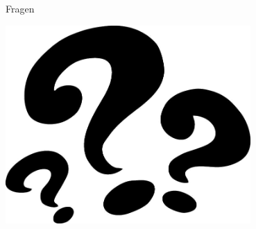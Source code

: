 \documentclass[hyperref={pdfpagelabels=false}]{beamer}
\begin{document}
\begin{frame}{Fragen}
\begin{center}
\includegraphics[width=0.7\textwidth]{./images/question-marks.png}
\end{center}
\end{frame}
\end{document}
